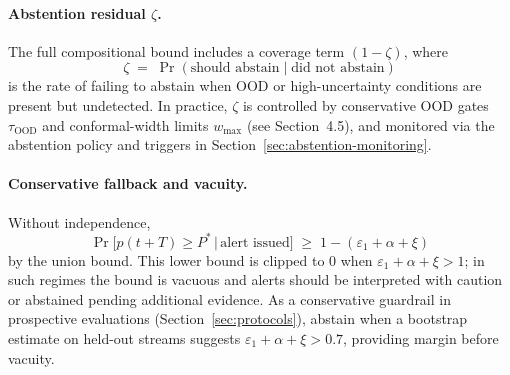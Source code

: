 \documentclass[11pt]{article}
\begin{document}
\paragraph{Abstention residual $\zeta$.}
The full compositional bound includes a coverage term $(1-\zeta)$, where
\[
\zeta \;=\; \Pr(\text{should abstain} \mid \text{did not abstain})
\]
is the rate of failing to abstain when OOD or high-uncertainty conditions are present but undetected. In practice, $\zeta$ is controlled by conservative OOD gates $\tau_{\text{OOD}}$ and conformal-width limits $w_{\max}$ (see Section~4.5), and monitored via the abstention policy and triggers in Section~\ref{sec:abstention-monitoring}.

\paragraph{Conservative fallback and vacuity.}
Without independence,
\[
\Pr\!\big[p(t{+}T)\ge P^* \,\big|\, \text{alert issued}\big] \;\ge\; 1-(\varepsilon_1+\alpha+\xi)
\]
by the union bound. This lower bound is clipped to $0$ when $\varepsilon_1+\alpha+\xi>1$; in such regimes the bound is vacuous and alerts should be interpreted with caution or abstained pending additional evidence. As a conservative guardrail in prospective evaluations (Section~\ref{sec:protocols}), abstain when a bootstrap estimate on held-out streams suggests $\varepsilon_1+\alpha+\xi>0.7$, providing margin before vacuity.
\end{document}
